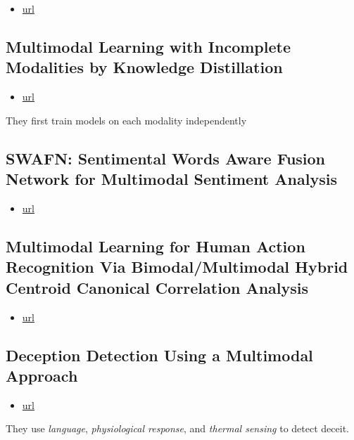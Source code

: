 \begin{itemize}
\item \href{https://aclanthology.org/P18-1208.pdf}{url}
\end{itemize}

\subsection{Multimodal Learning with Incomplete Modalities by Knowledge Distillation}

\begin{itemize}
\item \href{https://dl.acm.org/doi/pdf/10.1145/3394486.3403234}{url}
\end{itemize}
They first train models on each modality independently
\subsection{SWAFN: Sentimental Words Aware Fusion Network for Multimodal Sentiment Analysis}

\begin{itemize}
\item \href{https://aclanthology.org/2020.coling-main.93.pdf}{url}
\end{itemize}

\subsection{Multimodal Learning for Human Action Recognition Via Bimodal/Multimodal Hybrid Centroid Canonical Correlation Analysis}

\begin{itemize}
\item \href{https://ieeexplore.ieee.org/document/8489981}{url}
\end{itemize}

\subsection{Deception Detection Using a Multimodal Approach}

\begin{itemize}
\item \href{https://dl.acm.org/doi/pdf/10.1145/2663204.2663229?casa\_token=KneK7B7xvLwAAAAA:Ajz0N96ygq8ktwkz0IVUqTt8NozCg2wR6n\_x2xntdHqZBh6VXW\_8VbO4GeY4VvMsDJlMwzkhVXQSJA}{url}
\end{itemize}
They use \textit{language}, \textit{physiological response}, and \textit{thermal sensing} to detect deceit.

